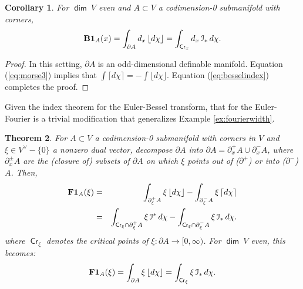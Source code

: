 \documentclass{psapm-l}
\newtheorem{theorem}{Theorem}[section]
\newtheorem{corollary}[theorem]{Corollary}
\theoremstyle{definition}
\theoremstyle{remark}
\numberwithin{equation}{section}
\begin{document}
\begin{corollary}
\label{cor:evendim}
For ${{{\operatorname{\mathsf{{dim}}}}}}\ V$ even and $A\subset V$ a codimension-0 submanifold with corners,
\begin{equation}
\label{eq:evendim}
    {{\bf B}}{{\mathbf{1}}}_A(x) = \int_{{\partial} A} d_x\, {{\lfloor d\chi\rfloor}}  = \int_{{{{\operatorname{\mathsf{{Cr}}}}}}_x} d_x\,{{\mathcal I}}_*\,d\chi .
\end{equation}
\end{corollary}
\begin{proof}
In this setting, ${\partial} A$ is an odd-dimensional definable manifold. Equation (\ref{eq:morse3}) implies that $\int {{\lceil d\chi\rceil}}=-\int {{\lfloor d\chi\rfloor}}$. Equation (\ref{eq:besselindex}) completes the proof.
\end{proof}

Given the index theorem for the Euler-Bessel transform, that for the Euler-Fourier is a trivial modification that generalizes Example \ref{ex:fourierwidth}.

\begin{theorem}
\label{thm:fourierdchi}
For $A\subset V$ a codimension-0 submanifold with corners in $V$ and $\xi\in V^\vee-\{0\}$ a nonzero dual vector, decompose ${\partial} A$ into ${\partial} A={\partial}_x^+A\cup{\partial}_x^-A$, where ${\partial}_x^\pm A$ are the (closure of) subsets of ${\partial} A$ on which $\xi$ points out of (${\partial}^+$) or into (${\partial}^-$) $A$. Then,
\begin{eqnarray}
\label{eq:fourierindex}
    {{\bf F}}{{\mathbf{1}}}_A(\xi)
            &=& \int_{{\partial}_{\xi}^+A} \xi\, {{\lfloor d\chi\rfloor}} - \int_{{\partial}_{\xi}^-A} \xi\, {{\lceil d\chi\rceil}} \\
            &=& \int_{{{{\operatorname{\mathsf{{Cr}}}}}}_\xi\cap{\partial}_{\xi}^+A} \xi\, {{\mathcal I}}^*\, d\chi - \int_{{{{\operatorname{\mathsf{{Cr}}}}}}_\xi\cap{\partial}_\xi^-A} \xi\, {{\mathcal I}}_*\, d\chi .
\end{eqnarray}
where ${{{\operatorname{\mathsf{{Cr}}}}}}_\xi$ denotes the critical points of $\xi\colon{\partial} A\to[0,\infty)$. For ${{{\operatorname{\mathsf{{dim}}}}}}\ V$ even, this becomes:
\begin{equation}
    {{\bf F}}{{\mathbf{1}}}_A(\xi) = \int_{{\partial} A} \xi\, {{\lfloor d\chi\rfloor}}  = \int_{{{{\operatorname{\mathsf{{Cr}}}}}}_\xi} \xi\,{{\mathcal I}}_*\,d\chi .
\end{equation}
\end{theorem}
\end{document}
